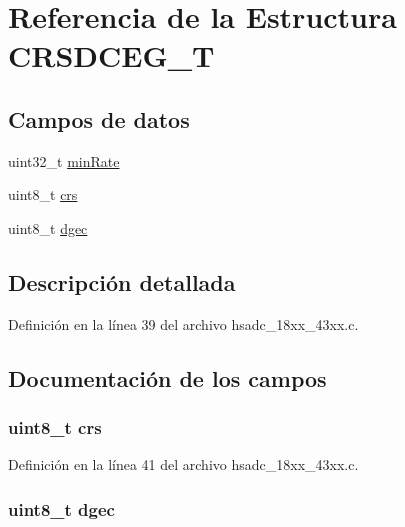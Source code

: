 \hypertarget{struct_c_r_s_d_c_e_g___t}{}\section{Referencia de la Estructura C\+R\+S\+D\+C\+E\+G\+\_\+T}
\label{struct_c_r_s_d_c_e_g___t}
\subsection*{Campos de datos}
\begin{DoxyCompactItemize}
\item 
uint32\+\_\+t \hyperlink{struct_c_r_s_d_c_e_g___t_ac656152b25650f4bb70b5dccd40d53aa}{min\+Rate}
\item 
uint8\+\_\+t \hyperlink{struct_c_r_s_d_c_e_g___t_a597ace1fb6d067199b48a497bffb165c}{crs}
\item 
uint8\+\_\+t \hyperlink{struct_c_r_s_d_c_e_g___t_a39de7d8e7d4415ea959d4246e567d8f2}{dgec}
\end{DoxyCompactItemize}


\subsection{Descripción detallada}


Definición en la línea 39 del archivo hsadc\+\_\+18xx\+\_\+43xx.\+c.



\subsection{Documentación de los campos}
\subsubsection[{\texorpdfstring{crs}{crs}}]{\setlength{\rightskip}{0pt plus 5cm}uint8\+\_\+t crs}\hypertarget{struct_c_r_s_d_c_e_g___t_a597ace1fb6d067199b48a497bffb165c}{}\label{struct_c_r_s_d_c_e_g___t_a597ace1fb6d067199b48a497bffb165c}


Definición en la línea 41 del archivo hsadc\+\_\+18xx\+\_\+43xx.\+c.

\subsubsection[{\texorpdfstring{dgec}{dgec}}]{\setlength{\rightskip}{0pt plus 5cm}uint8\+\_\+t dgec}\hypertarget{struct_c_r_s_d_c_e_g___t_a39de7d8e7d4415ea959d4246e567d8f2}{}\label{struct_c_r_s_d_c_e_g___t_a39de7d8e7d4415ea959d4246e567d8f2}


